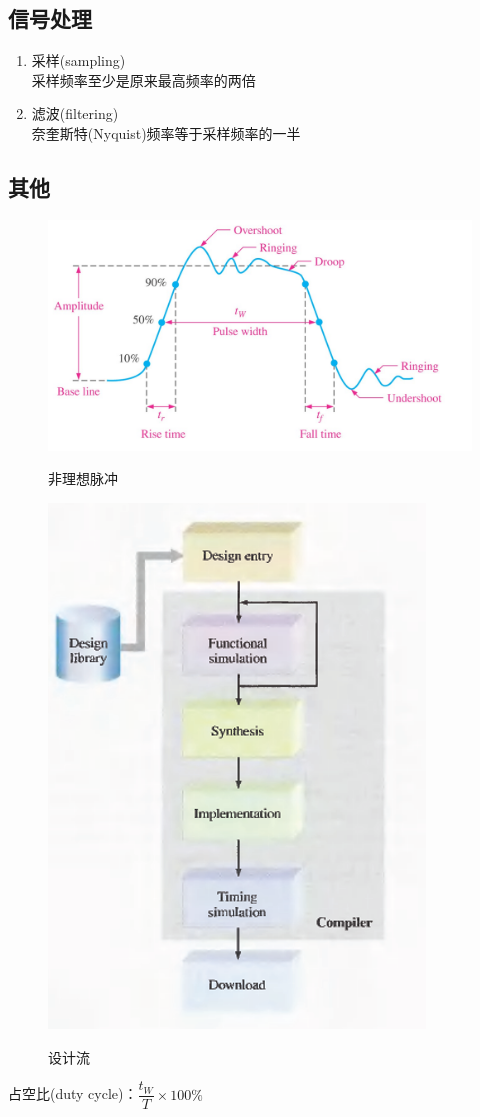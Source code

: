 \subsection{信号处理}
\begin{enumerate}
	\item 采样(sampling)\\
	采样频率至少是原来最高频率的两倍
	\item 滤波(filtering)\\
	奈奎斯特(Nyquist)频率等于采样频率的一半
\end{enumerate}

\subsection{其他}
\begin{figure}[htbp]
\begin{minipage}{0.5\linewidth}
	\centerline{\includegraphics[width=\linewidth]{fig/nonideal_pulse_characteristics.jpg}}
	\centerline{非理想脉冲}
\end{minipage}
\begin{minipage}{0.5\linewidth}
	\centerline{\includegraphics[width=0.6\linewidth]{fig/design_flow.png}}
	\centerline{设计流}
\end{minipage}
\end{figure}
占空比(duty cycle)：$\dfrac{t_W}{T}\times 100\%$